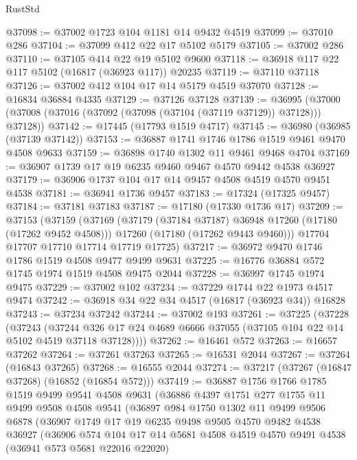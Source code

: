 \begin{lexlean}{RustStd}
\begin{coremodule}
@37098 := @37002 @1723 @104 @1181 @14 @9432 @4519
@37099 := @37010 @286
@37104 := @37099 @412 @22 @17 @5102 @5179
@37105 := @37002 @286
@37110 := @37105 @414 @22 @19 @5102 @9600
@37118 := @36918 @117 @22 @117 @5102 (@16817 (@36923 @117)) @20235
@37119 := @37110 @37118
@37126 := @37002 @412 @104 @17 @14 @5179 @4519 @37070
@37128 := @16834 @36884 @4335
@37129 := @37126 @37128
@37139 := @36995 (@37000 (@37008 (@37016 (@37092 (@37098 (@37104 (@37119 @37129)) @37128))) @37128))
@37142 := @17445 (@17793 @1519 @4717)
@37145 := @36980 (@36985 (@37139 @37142))
@37153 := @36887 @1741 @1746 @1786 @1519 @9461 @9470 @4508 @9633
@37159 := @36898 @1740 @1302 @11 @9461 @9468 @4704
@37169 := @36907 @1739 @17 @19 @6235 @9460 @9467 @4570 @9442 @4538 @36927
@37179 := @36906 @1737 @104 @17 @14 @9457 @4508 @4519 @4570 @9451 @4538
@37181 := @36941 @1736 @9457
@37183 := @17324 (@17325 @9457)
@37184 := @37181 @37183
@37187 := @17180 (@17330 @1736 @17)
@37209 := @37153
    (@37159
      (@37169
        (@37179 (@37184 @37187) @36948 @17260 (@17180 (@17262 @9452 @4508)))
        @17260
        (@17180 (@17262 @9443 @9460)))
      @17704
      @17707
      @17710
      @17714
      @17719
      @17725)
@37217 := @36972 @9470 @1746 @1786 @1519 @4508 @9477 @9499 @9631
@37225 := @16776 @36884 @572 @1745 @1974 @1519 @4508 @9475 @2044
@37228 := @36997 @1745 @1974 @9475
@37229 := @37002 @102
@37234 := @37229 @1744 @22 @1973 @4517 @9474
@37242 := @36918 @34 @22 @34 @4517 (@16817 (@36923 @34)) @16828
@37243 := @37234 @37242
@37244 := @37002 @193
@37261 := @37225
    (@37228
      (@37243
        (@37244 @326 @17 @24 @4689 @6666 @37055 (@37105 @104 @22 @14 @5102 @4519 @37118 @37128))))
@37262 := @16461 @572
@37263 := @16657 @37262
@37264 := @37261 @37263
@37265 := @16531 @2044
@37267 := @37264 (@16843 @37265)
@37268 := @16555 @2044
@37274 := @37217 (@37267 (@16847 @37268) (@16852 (@16854 @572)))
@37419 := @36887
    @1756
    @1766
    @1785
    @1519
    @9499
    @9541
    @4508
    @9631
    (@36886
      @4397
      @1751
      @277
      @1755
      @11
      @9499
      @9508
      @4508
      @9541
      (@36897
        @984
        @1750
        @1302
        @11
        @9499
        @9506
        @6878
        (@36907
          @1749
          @17
          @19
          @6235
          @9498
          @9505
          @4570
          @9482
          @4538
          @36927
          (@36906
            @574
            @104
            @17
            @14
            @5681
            @4508
            @4519
            @4570
            @9491
            @4538
            (@36941 @573 @5681 @22016 @22020)

\end{coremodule}
\end{lexlean}
